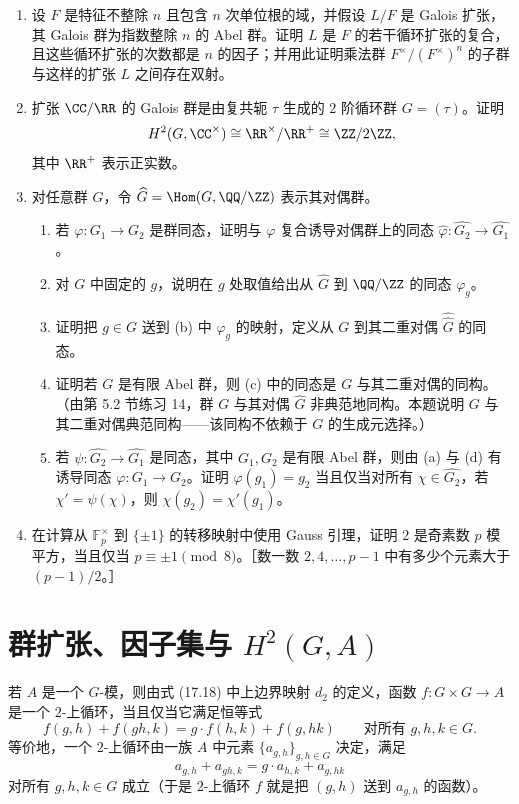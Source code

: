 \begin{enumerate}[label=\arabic*.]
  \item 设 $F$ 是特征不整除 $n$ 且包含 $n$ 次单位根的域，并假设 $L/F$ 是 Galois 扩张，其 Galois 群为指数整除 $n$ 的 Abel 群。证明 $L$ 是 $F$ 的若干循环扩张的复合，且这些循环扩张的次数都是 $n$ 的因子；并用此证明乘法群 $F^\times/(F^\times)^n$ 的子群与这样的扩张 $L$ 之间存在双射。

  \item 扩张 $\CC/\RR$ 的 Galois 群是由复共轭 $\tau$ 生成的 $2$ 阶循环群 $G=(\tau)$。证明
  \[
    H^2(G,\CC^\times)\cong\RR^\times/\RR^+\cong\ZZ/2\ZZ,
  \]
  其中 $\RR^+$ 表示正实数。

  \item 对任意群 $G$，令 $\widehat G=\Hom(G,\QQ/\ZZ)$ 表示其对偶群。
  \begin{enumerate}[label=(\alph*)]
    \item 若 $\varphi:G_1\to G_2$ 是群同态，证明与 $\varphi$ 复合诱导对偶群上的同态 $\widehat\varphi:\widehat{G_2}\to\widehat{G_1}$。
    \item 对 $G$ 中固定的 $g$，说明在 $g$ 处取值给出从 $\widehat G$ 到 $\QQ/\ZZ$ 的同态 $\varphi_g$。
    \item 证明把 $g\in G$ 送到 (b) 中 $\varphi_g$ 的映射，定义从 $G$ 到其二重对偶 $\widehat{\widehat G}$ 的同态。
    \item 证明若 $G$ 是有限 Abel 群，则 (c) 中的同态是 $G$ 与其二重对偶的同构。（由第 5.2 节练习 14，群 $G$ 与其对偶 $\widehat G$ 非典范地同构。本题说明 $G$ 与其二重对偶典范同构——该同构不依赖于 $G$ 的生成元选择。）
    \item 若 $\psi:\widehat{G_2}\to\widehat{G_1}$ 是同态，其中 $G_1,G_2$ 是有限 Abel 群，则由 (a) 与 (d) 有诱导同态 $\varphi:G_1\to G_2$。证明 $\varphi(g_1)=g_2$ 当且仅当对所有 $\chi\in\widehat{G_2}$，若 $\chi'=\psi(\chi)$，则 $\chi(g_2)=\chi'(g_1)$。
  \end{enumerate}

  \item 在计算从 $\mathbb F_p^\times$ 到 $\{\pm1\}$ 的转移映射中使用 Gauss 引理，证明 $2$ 是奇素数 $p$ 模平方，当且仅当 $p\equiv\pm1\pmod 8$。［数一数 $2,4,
  \ldots,p-1$ 中有多少个元素大于 $(p-1)/2$。］
\end{enumerate}


\section[群扩张、因子集与 H2(G,A)]{群扩张、因子集与 $H^2(G,A)$}

若 $A$ 是一个 $G$-模，则由式 (17.18) 中上边界映射 $d_2$ 的定义，函数 $f:G\times G\to A$ 是一个 $2$-上循环，当且仅当它满足恒等式
\[
  f(g,h)+f(gh,k)=g\cdot f(h,k)+f(g,hk)\qquad\text{对所有 }g,h,k\in G.
  \tag{17.26}
\]
等价地，一个 $2$-上循环由一族 $A$ 中元素 $\{a_{g,h}\}_{g,h\in G}$ 决定，满足
\[
  a_{g,h}+a_{gh,k}=g\cdot a_{h,k}+a_{g,hk}
\]
对所有 $g,h,k\in G$ 成立（于是 $2$-上循环 $f$ 就是把 $(g,h)$ 送到 $a_{g,h}$ 的函数）。

